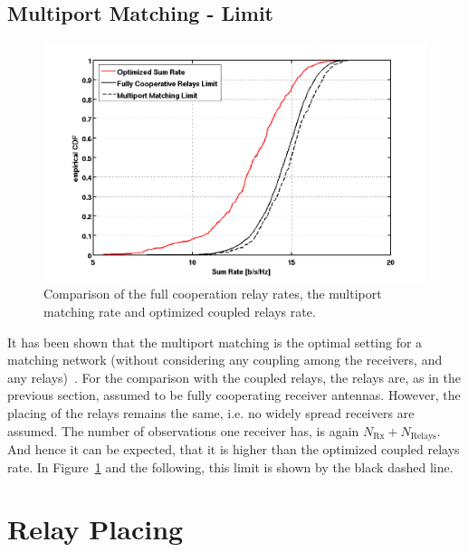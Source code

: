 \subsection{Multiport Matching - Limit}
\label{sec:mp_limit}
\begin{figure}[h]
\centering
  \includegraphics[width=0.9\linewidth]{images/Limitcomparison.png}
\caption{Comparison of the full cooperation relay rates, the multiport matching rate and optimized coupled relays rate.}
\label{fig:limcomparison}
\end{figure}

It has been shown that the multiport matching is the optimal setting for a matching network (without considering any coupling among the receivers, and any relays)~\cite{Nossek}.
For the comparison with the coupled relays, the relays are, as in the previous section, assumed to be fully cooperating receiver antennas.
However, the placing of the relays remains the same, i.e. no widely spread receivers are assumed.
The number of observations one receiver has, is again $N_\text{Rx} + N_\text{Relays}$.
And hence it can be expected, that it is higher than the optimized coupled relays rate.
In Figure~\ref{fig:limcomparison} and the following, this limit is shown by the black dashed line.


\section{Relay Placing}
\label{sec:relay_placing}

